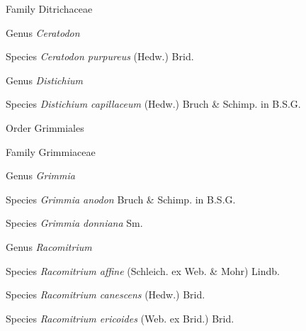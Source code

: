 \documentclass[9pt, article]{memoir}
\begin{document}
\begin{multicols}{2}
\vspace{6pt}\noindent\hspace{24pt}Family Ditrichaceae


\vspace{6pt}\noindent\hspace{30pt}Genus \textit{Ceratodon}


\vspace{6pt}\noindent\hspace{36pt}Species \textit{Ceratodon purpureus} (Hedw.) Brid.


\vspace{6pt}\noindent\hspace{30pt}Genus \textit{Distichium}


\vspace{6pt}\noindent\hspace{36pt}Species \textit{Distichium capillaceum} (Hedw.) Bruch \& Schimp. in B.S.G.


\vspace{6pt}\noindent\hspace{18pt}Order Grimmiales


\vspace{6pt}\noindent\hspace{24pt}Family Grimmiaceae


\vspace{6pt}\noindent\hspace{30pt}Genus \textit{Grimmia}


\vspace{6pt}\noindent\hspace{36pt}Species \textit{Grimmia anodon} Bruch \& Schimp. in B.S.G.


\vspace{6pt}\noindent\hspace{36pt}Species \textit{Grimmia donniana} Sm.


\vspace{6pt}\noindent\hspace{30pt}Genus \textit{Racomitrium}


\vspace{6pt}\noindent\hspace{36pt}Species \textit{Racomitrium affine} (Schleich. ex Web. \& Mohr) Lindb.


\vspace{6pt}\noindent\hspace{36pt}Species \textit{Racomitrium canescens} (Hedw.) Brid.


\vspace{6pt}\noindent\hspace{36pt}Species \textit{Racomitrium ericoides} (Web. ex Brid.) Brid.



\end{multicols}
\end{document}
